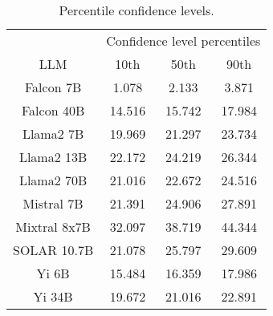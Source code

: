 \begin{table*}
\centering
\begin{tabular}{c|c|c|c}
& \multicolumn{3}{c}{Confidence level percentiles} \\ 
LLM & 10th & 50th & 90th\\ \hline
Falcon 7B & 1.078 & 2.133 & 3.871\\
Falcon 40B & 14.516 & 15.742 & 17.984\\
Llama2 7B & 19.969 & 21.297 & 23.734\\
Llama2 13B & 22.172 & 24.219 & 26.344\\
Llama2 70B & 21.016 & 22.672 & 24.516\\
Mistral 7B & 21.391 & 24.906 & 27.891\\
Mixtral 8x7B & 32.097 & 38.719 & 44.344\\
SOLAR 10.7B & 21.078 & 25.797 & 29.609\\
Yi 6B & 15.484 & 16.359 & 17.986\\
Yi 34B & 19.672 & 21.016 & 22.891\\
\hline
\end{tabular}
\caption{Percentile confidence levels.}
\label{tab:percentile_conf}
\end{table*}
